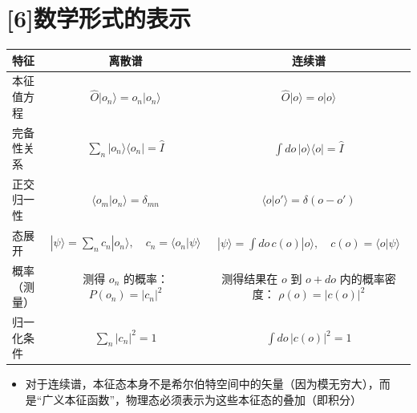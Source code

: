 \section*{[6]数学形式的表示}
\begin{tabular}{|l|c|c|}
	\hline
	特征 & 离散谱 & 连续谱 \\
	\hline
	本征值方程 & $\hat{O} | o_n \rangle = o_n | o_n \rangle$ & $\hat{O} | o \rangle = o | o \rangle$ \\
	\hline
	完备性关系 & $\sum_n | o_n \rangle\langle o_n | = \hat{I}$ & $\int do\, | o \rangle\langle o | = \hat{I}$ \\
	\hline
	正交归一性 & $\langle o_m | o_n \rangle = \delta_{mn}$ & $\langle o | o' \rangle = \delta(o - o')$ \\
	\hline
	态展开 & $ |\psi\rangle = \sum_n c_n | o_n \rangle, \quad c_n = \langle o_n | \psi \rangle $ & $ |\psi\rangle = \int do\, c(o) | o \rangle, \quad c(o) = \langle o | \psi \rangle $ \\
	\hline
	概率（测量） & 测得 $o_n$ 的概率：$ P(o_n) = |c_n|^2 $ & 
	\makecell[l]{测得结果在 $o$ 到 $o+do$ 内的概率密度： \\ $\rho(o) = |c(o)|^2$} \\
	\hline
	归一化条件 & $\sum_n |c_n|^2 = 1$ & $\int do\, |c(o)|^2 = 1$ \\
	\hline
\end{tabular}

\begin{itemize}
	\item 对于连续谱，本征态本身不是希尔伯特空间中的矢量（因为模无穷大），而是“广义本征函数”，物理态必须表示为这些本征态的叠加（即积分）
\end{itemize}
